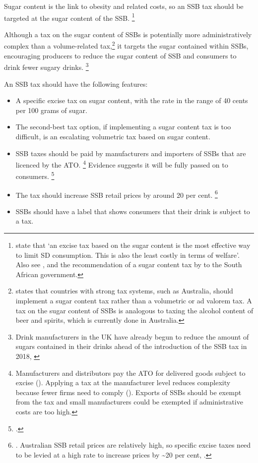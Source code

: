 \documentclass[embargoed]{grattan}
\begin{document}
Sugar content is the link to obesity and related costs, so an SSB tax should be targeted at the sugar content of the SSB. \footnote{\textcite{Bonnet2013Taxincidencestrategic} state that `an excise tax based on the sugar content is the most effective way to limit SD consumption.
This is also the least costly in terms of welfare'.
Also see \textcite{Smith2016SoftDrinksLevy}, \textcite{Organization2016FiscalPoliciesDiet} and the  recommendation of a sugar content tax by \textcite{SouthAfricaNationalTreasury2016TaxationSugarSweetened} to the South African government.}

Although a tax on the sugar content of SSBs is potentially more administratively complex than a volume-related tax,\footnote{\textcite{Organization2016FiscalPoliciesDiet} states that countries with strong tax systems, such as Australia, should implement a sugar content tax rather than a volumetric or ad valorem tax.
A tax on the sugar content of SSBs is analogous to taxing the alcohol content of beer and spirits, which is currently done in Australia.} it targets the sugar contained within SSBs, encouraging producers to reduce the sugar content of SSB and consumers to drink fewer sugary drinks.%
\footnote{Drink manufacturers in the UK have already begun to reduce the amount of sugars contained in their drinks ahead of the introduction of the SSB tax in 2018, \textcite{Team2016Sugarlevyworking}}

An SSB tax should have the following features:

\begin{itemize}
\item
  A specific excise tax on sugar content, with the rate in the range of 40 cents per 100 grams of sugar.
\item
  The second-best tax option, if implementing a sugar content tax is too difficult, is an escalating volumetric tax based on sugar content.
\item
  SSB taxes should be paid by manufacturers and importers of SSBs that are licenced by the ATO.%
\footnote{Manufacturers and distributors pay the ATO for delivered goods subject to excise (\textcite{Office2016Reportingexcisepaying}).
Applying a tax at the manufacturer level reduces complexity because fewer firms need to comply (\textcites{Freebairn2010Taxationobesity}{CnossenExcisetaxationAustralia}).
Exports of SSBs should be exempt from the tax and small manufacturers could be exempted if administrative costs are too high.} Evidence suggests it will be fully passed on to consumers.%
\footcites{Grogger2015Sodataxesprices}{Bergman2010Areexcisetaxes}{Berardi2016impactsodataxon}{Bonnet2013Taxincidencestrategic}{Solutions2016BestPracticesDesigning}
\item
  The tax should increase SSB retail prices by around 20 per cent. \footnote{\textcite{Organization2016FiscalPoliciesDiet}.
Australian SSB retail prices are relatively high, so specific excise taxes need to be levied at a high rate to increase prices by \textasciitilde{}20 per cent, \textcite{Long2015Costeffectivenesssugar}.}
\item
  SSBs should have a label that shows consumers that their drink is subject to a tax.
\end{itemize}
\end{document}
